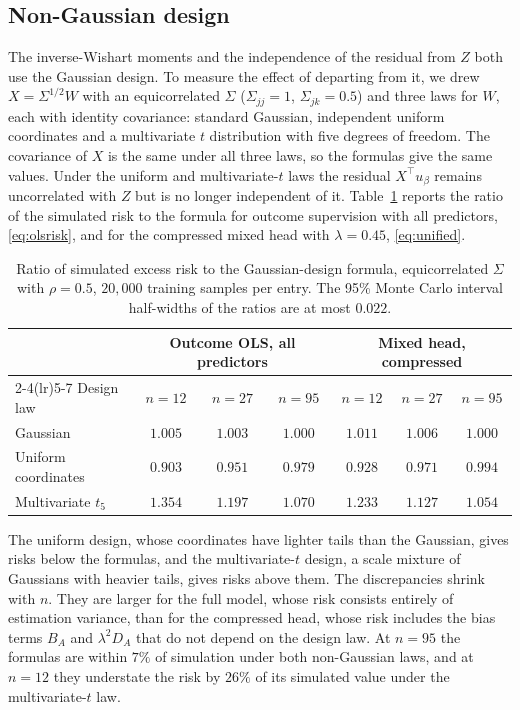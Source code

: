 \documentclass[11pt]{article}
\theoremstyle{remark}
\newcommand{\1}{\mathbf 1}
\begin{document}
\subsection{Non-Gaussian design}
The inverse-Wishart moments and the independence of the residual from $Z$ both use the Gaussian design. To measure the effect of departing from it, we drew $X=\Sigma^{1/2}W$ with an equicorrelated $\Sigma$ ($\Sigma_{jj}=1$, $\Sigma_{jk}=0.5$) and three laws for $W$, each with identity covariance: standard Gaussian, independent uniform coordinates and a multivariate $t$ distribution with five degrees of freedom. The covariance of $X$ is the same under all three laws, so the formulas give the same values. Under the uniform and multivariate-$t$ laws the residual $X^\top u_\beta$ remains uncorrelated with $Z$ but is no longer independent of it. Table~\ref{tab:robust} reports the ratio of the simulated risk to the formula for outcome supervision with all predictors, \eqref{eq:olsrisk}, and for the compressed mixed head with $\lambda=0.45$, \eqref{eq:unified}.

\begin{table}[ht]
\centering\small
\caption{Ratio of simulated excess risk to the Gaussian-design formula, equicorrelated $\Sigma$ with $\rho=0.5$, $20{,}000$ training samples per entry. The 95\% Monte Carlo interval half-widths of the ratios are at most $0.022$.}\label{tab:robust}
\begin{tabular}{lcccccc}
\toprule
& \multicolumn{3}{c}{Outcome OLS, all predictors} & \multicolumn{3}{c}{Mixed head, compressed} \\
\cmidrule(lr){2-4}\cmidrule(lr){5-7}
Design law & $n=12$ & $n=27$ & $n=95$ & $n=12$ & $n=27$ & $n=95$ \\
\midrule
Gaussian & $1.005$ & $1.003$ & $1.000$ & $1.011$ & $1.006$ & $1.000$ \\
Uniform coordinates & $0.903$ & $0.951$ & $0.979$ & $0.928$ & $0.971$ & $0.994$ \\
Multivariate $t_5$ & $1.354$ & $1.197$ & $1.070$ & $1.233$ & $1.127$ & $1.054$ \\
\bottomrule
\end{tabular}
\end{table}

The uniform design, whose coordinates have lighter tails than the Gaussian, gives risks below the formulas, and the multivariate-$t$ design, a scale mixture of Gaussians with heavier tails, gives risks above them. The discrepancies shrink with $n$. They are larger for the full model, whose risk consists entirely of estimation variance, than for the compressed head, whose risk includes the bias terms $B_A$ and $\lambda^2D_A$ that do not depend on the design law. At $n=95$ the formulas are within $7\%$ of simulation under both non-Gaussian laws, and at $n=12$ they understate the risk by $26\%$ of its simulated value under the multivariate-$t$ law.
\end{document}
